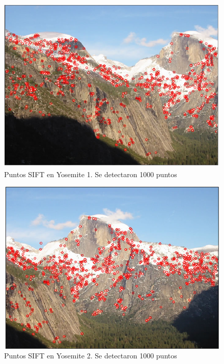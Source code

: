 \documentclass[12pt,spanish]{article} %
\begin{document}
\begin{figure}[H]
  \begin{center}
  \includegraphics[scale=.6]{ej1_sift1}
  \caption{Puntos SIFT en Yosemite 1. Se detectaron 1000 puntos}
  \label{fig:ej1_sift1}
  \end{center}
\end{figure}

\newpage

\begin{figure}[H]
  \begin{center}
  \includegraphics[scale=0.6]{ej1_surf1_ht500-2}
  \caption{Puntos SIFT en Yosemite 2. Se detectaron 1000 puntos}
  \label{fig:ej1_sift2}
  \end{center}
\end{figure}
\end{document}
